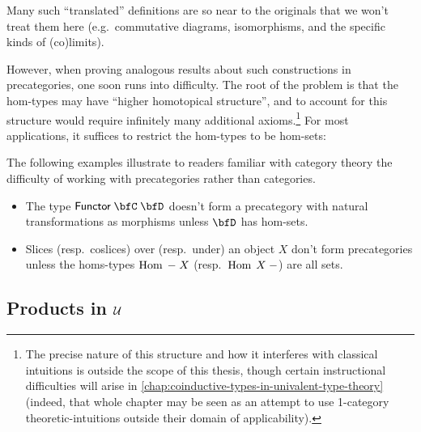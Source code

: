 \documentclass[./thesis.tex]{subfiles}
\begin{document}
Many such ``translated'' definitions are so near to the originals that we won't
treat them here (e.g.\ commutative diagrams, isomorphisms, and the specific
kinds of (co)limits).

However, when proving analogous results about such constructions in
precategories, one soon runs into difficulty. The
root of the problem is that the hom-types may have ``higher homotopical
structure'', and to account for this structure would require infinitely many
additional axioms.\footnote{The precise nature of this structure and how it
  interferes with classical intuitions is outside the scope of this thesis,
  though certain instructional difficulties will arise in
  \cref{chap:coinductive-types-in-univalent-type-theory} (indeed, that whole
  chapter may be seen as an attempt to use 1-category theoretic-intuitions
  outside their domain of applicability).} 
For most applications, it suffices to restrict the hom-types to be hom-sets:

\begin{example}
  The following examples illustrate to readers familiar with category theory the
  difficulty of working with precategories rather than categories. 
  \begin{itemize}
    \itemsep0em
    \item The type $\appply{\Functor}{\bfC}{\bfD}$ doesn't form a precategory
      with natural transformations as morphisms unless $\bfD$ has hom-sets. 
    \item Slices (resp.\ coslices) over (resp.\ under) an object $X$ don't form
      precategories unless the homs-types $\operatorname{Hom}\hspace{0.25em} - \hspace{0.25em} X$ (resp.\
      $\operatorname{Hom}\hspace{0.25em} X \hspace{0.25em} -$) are all sets.
  \end{itemize}
\end{example}

\subsection{Products in $\mathcal{U}$}
\label{subsec:products-in-universe}
\end{document}
